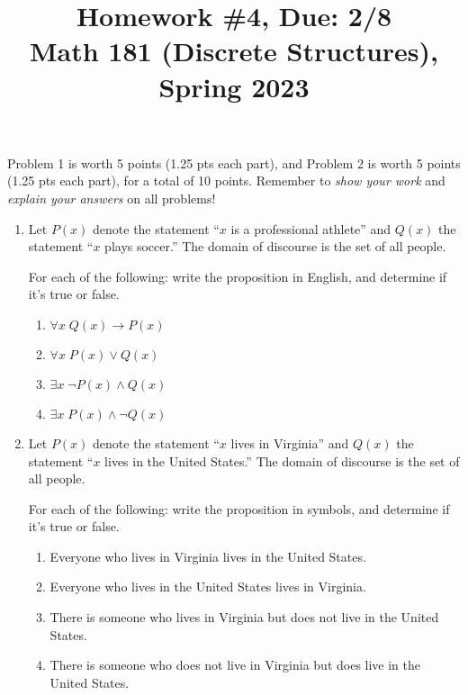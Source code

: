 \documentclass[11pt]{article}
\title{Homework \#4, Due: 2/8 \\Math 181 (Discrete Structures), Spring 2023}
\date{}
\begin{document}
\maketitle

\thispagestyle{empty}

\vspace{-1cm}

Problem 1 is worth 5 points (1.25 pts each part), and Problem 2 is worth 5 points (1.25 pts each part), for a total of 10 points. Remember to \emph{show your work} and \emph{explain your answers} on all problems!

\begin{enumerate}
\item Let $P(x)$ denote the statement ``$x$ is a professional athlete'' and $Q(x)$ the statement ``$x$ plays soccer.'' The domain of discourse is the set of all people. 

For each of the following: write the proposition in English, and determine if it's true or false.
\begin{enumerate}
\item $\forall x \; Q(x) \to P(x)$
\item $\forall x \; P(x) \vee Q(x)$
\item $\exists x \; \neg P(x) \wedge Q(x)$
\item $\exists x \; P(x) \wedge \neg Q(x)$
\end{enumerate}

\item Let $P(x)$ denote the statement ``$x$ lives in Virginia'' and $Q(x)$ the statement ``$x$ lives in the United States.'' The domain of discourse is the set of all people. 

For each of the following: write the proposition in symbols, and determine if it's true or false.
\begin{enumerate}
\item Everyone who lives in Virginia lives in the United States.
\item Everyone who lives in the United States lives in Virginia.
\item There is someone who lives in Virginia but does not live in the United States.
\item There is someone who does not live in Virginia but does live in the United States.
\end{enumerate}

\end{enumerate}
\end{document}
